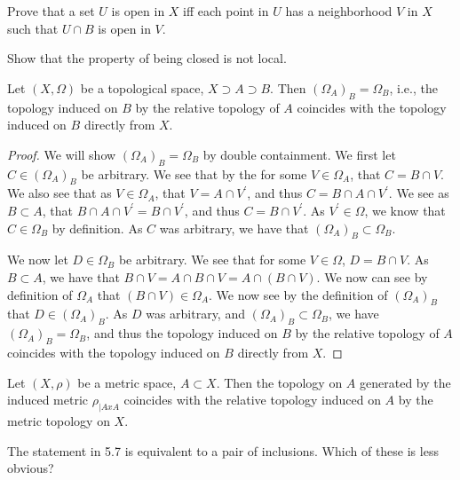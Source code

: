\begin{minorEx}%
Prove that a set $U$ is open in $X$ iff each point in $U$ has a neighborhood $V$ in $X$ such that $U \cap B$ is open in $V$.
\end{minorEx}

\begin{minorEx}%
Show that the property of being closed is not local.
\end{minorEx}

\begin{majorEx}%
Let $(X, \Omega)$ be a topological space, $X \supset A \supset B$. Then $(\Omega_A)_B=\Omega_B$, i.e., the topology induced on $B$ by the relative topology of $A$ coincides with the topology induced on $B$ directly from $X$.
\end{majorEx}

\begin{proof}
  We will show $(\Omega_A)_B=\Omega_B$ by double containment. We first
  let $C \in (\Omega_A)_B$ be arbitrary. We see that by the for some
  $V \in \Omega_A$, that $C = B \cap V$. We also see that as $V \in
  \Omega_A$, that $V = A \cap  V^\prime$, and thus $C = B \cap A \cap
  V^\prime$. We see as $B\subset A$, that 
  $B \cap A \cap V^\prime=B \cap V^\prime$, and thus $C =B \cap
  V^\prime$. As $V^\prime \in \Omega$, we know that $C \in \Omega_B$
  by definition. As $C$ was arbitrary, we have that 
  $(\Omega_A)_B \subset \Omega_B$.

  We now let $D \in \Omega_B$ be arbitrary. We see that for some $V
  \in \Omega$, $D = B \cap V$. As $B\subset A$, we have that $B \cap V
  = A\cap B \cap V=A\cap (B \cap V)$. We now can see by definition of
  $\Omega_A$ that $(B \cap V) \in \Omega_A$. We now see by the
  definition of $(\Omega_A)_B$ that $D\in (\Omega_A)_B$. As $D$ was
  arbitrary, and $(\Omega_A)_B \subset \Omega_B$, we have 
  $(\Omega_A)_B = \Omega_B$, and thus the topology induced on $B$ by
  the relative topology of $A$ coincides with the topology induced on
  $B$ directly from $X$.
  
\end{proof}

\begin{minorEx}%
Let $(X, \rho)$ be a metric space, $A \subset X$. Then the topology on $A$ generated by the induced metric $\rho_{|AxA}$ coincides with the relative topology induced on $A$ by the metric topology on $X$.
\end{minorEx}

\begin{minorEx}[Riddle]%
The statement in 5.7 is equivalent to a pair of inclusions. Which of these is less obvious?
\end{minorEx}


